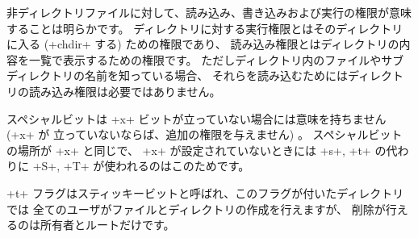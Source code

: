 非ディレクトリファイルに対して、読み込み、書き込みおよび実行の権限が意味することは明らかです。
ディレクトリに対する実行権限とはそのディレクトリに入る (\ml+chdir+ する) ための権限であり、
読み込み権限とはディレクトリの内容を一覧で表示するための権限です。
ただしディレクトリ内のファイルやサブディレクトリの名前を知っている場合、
それらを読み込むためにはディレクトリの読み込み権限は必要ではありません。

スペシャルビットは \ml+x+ ビットが立っていない場合には意味を持ちません
(\ml+x+ が 立っていないならば、追加の権限を与えません) 。
スペシャルビットの場所が \ml+x+ と同じで、
\ml+x+ が設定されていないときには \ml+s+, \ml+t+ の代わりに \ml+S+, \ml+T+ が使われるのはこのためです。

\ml+t+ フラグはスティッキービットと呼ばれ、このフラグが付いたディレクトリでは
全てのユーザがファイルとディレクトリの作成を行えますが、
削除が行えるのは所有者とルートだけです。

